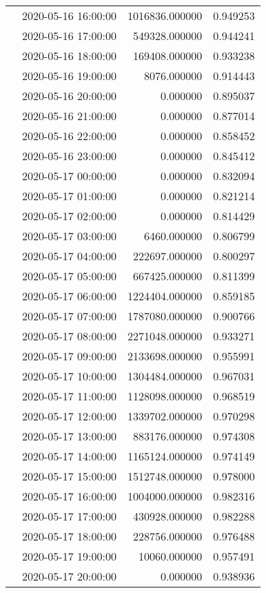 \begin{tabular}{llrr}
 & 2020-05-16 16:00:00 & 1016836.000000 & 0.949253 \\
 & 2020-05-16 17:00:00 & 549328.000000 & 0.944241 \\
 & 2020-05-16 18:00:00 & 169408.000000 & 0.933238 \\
 & 2020-05-16 19:00:00 & 8076.000000 & 0.914443 \\
 & 2020-05-16 20:00:00 & 0.000000 & 0.895037 \\
 & 2020-05-16 21:00:00 & 0.000000 & 0.877014 \\
 & 2020-05-16 22:00:00 & 0.000000 & 0.858452 \\
 & 2020-05-16 23:00:00 & 0.000000 & 0.845412 \\
 & 2020-05-17 00:00:00 & 0.000000 & 0.832094 \\
 & 2020-05-17 01:00:00 & 0.000000 & 0.821214 \\
 & 2020-05-17 02:00:00 & 0.000000 & 0.814429 \\
 & 2020-05-17 03:00:00 & 6460.000000 & 0.806799 \\
 & 2020-05-17 04:00:00 & 222697.000000 & 0.800297 \\
 & 2020-05-17 05:00:00 & 667425.000000 & 0.811399 \\
 & 2020-05-17 06:00:00 & 1224404.000000 & 0.859185 \\
 & 2020-05-17 07:00:00 & 1787080.000000 & 0.900766 \\
 & 2020-05-17 08:00:00 & 2271048.000000 & 0.933271 \\
 & 2020-05-17 09:00:00 & 2133698.000000 & 0.955991 \\
 & 2020-05-17 10:00:00 & 1304484.000000 & 0.967031 \\
 & 2020-05-17 11:00:00 & 1128098.000000 & 0.968519 \\
 & 2020-05-17 12:00:00 & 1339702.000000 & 0.970298 \\
 & 2020-05-17 13:00:00 & 883176.000000 & 0.974308 \\
 & 2020-05-17 14:00:00 & 1165124.000000 & 0.974149 \\
 & 2020-05-17 15:00:00 & 1512748.000000 & 0.978000 \\
 & 2020-05-17 16:00:00 & 1004000.000000 & 0.982316 \\
 & 2020-05-17 17:00:00 & 430928.000000 & 0.982288 \\
 & 2020-05-17 18:00:00 & 228756.000000 & 0.976488 \\
 & 2020-05-17 19:00:00 & 10060.000000 & 0.957491 \\
 & 2020-05-17 20:00:00 & 0.000000 & 0.938936 \\

\end{tabular}
